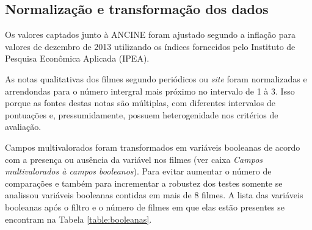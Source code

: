 \documentclass[11pt,a4paper]{article}
\begin{document}
\subsection{Normalização e transformação dos dados}


Os valores captados junto à ANCINE foram ajustado segundo a inflação para valores de dezembro de 2013 utilizando os índices fornecidos pelo Instituto de Pesquisa Econômica Aplicada (IPEA).

As notas qualitativas dos filmes segundo periódicos ou \textit{site} foram normalizadas e arrendondas para o número intergral mais próximo no intervalo de 1 à 3. Isso porque as fontes destas notas são múltiplas, com diferentes intervalos de pontuações e, pressumidamente, possuem heterogenidade nos critérios de avaliação. 

Campos multivalorados foram transformados em variáveis booleanas de acordo com a presença ou ausência da variável nos filmes (ver caixa \textit{Campos multivalorados à campos booleanos}). Para evitar aumentar o número de comparações e também para incrementar a robustez dos testes somente se analissou variáveis booleanas contidas em mais de 8 filmes. A lista das variáveis booleanas após o filtro e o número de filmes em que elas estão presentes se encontram na Tabela \ref{table:booleanas}.

\vspace*{0.2cm}
\end{document}
